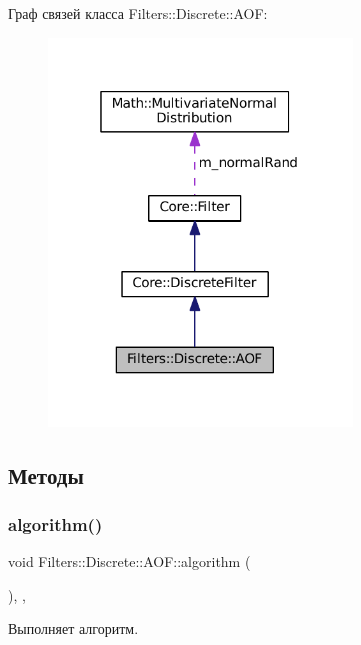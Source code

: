 Граф связей класса Filters\+:\+:Discrete\+:\+:A\+OF\+:
\nopagebreak
\begin{figure}[H]
\begin{center}
\leavevmode
\includegraphics[width=229pt]{class_filters_1_1_discrete_1_1_a_o_f__coll__graph}
\end{center}
\end{figure}


\subsection{Методы}
\hypertarget{class_filters_1_1_discrete_1_1_a_o_f_a22cbbf1054a17045c5e91ed7c5cba387}{}\label{class_filters_1_1_discrete_1_1_a_o_f_a22cbbf1054a17045c5e91ed7c5cba387} 
\subsubsection{\texorpdfstring{algorithm()}{algorithm()}}
{\footnotesize\ttfamily void Filters\+::\+Discrete\+::\+A\+O\+F\+::algorithm (\begin{DoxyParamCaption}{ }\end{DoxyParamCaption})\hspace{0.3cm}{\ttfamily [override]}, {\ttfamily [protected]}, {\ttfamily [virtual]}}



Выполняет алгоритм. 

